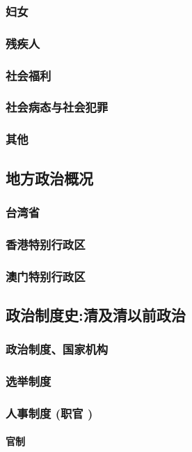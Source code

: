 \documentclass[UTF8]{../RepresentationUniverse}
\begin{document}
    \subsubsection{妇女}
    \subsubsection{残疾人}
    \subsubsection{社会福利}
    \subsubsection{社会病态与社会犯罪}
    \subsubsection{其他}

\subsection{地方政治概况}
    \subsubsection{台湾省}
    \subsubsection{香港特别行政区}
    \subsubsection{澳门特别行政区}


\subsection{政治制度史:清及清以前政治}
    \subsubsection{政治制度、国家机构}
    \subsubsection{选举制度}
    \subsubsection{人事制度 (职官 )}
        \paragraph{官制}
\end{document}

